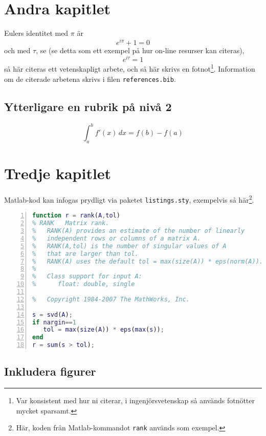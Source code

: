 \documentclass[10pt,oneside,swedish]{lips}
\begin{document}
\section{Andra kapitlet}
Eulers identitet med $\pi$ är
\begin{equation}
  e^{i\pi} + 1 = 0
\end{equation}
och med $\tau$, se \citep{HartVi:2011} (se detta som ett exempel på
hur on-line resurser kan citeras), 
\begin{equation}
  e^{i\tau} = 1
\end{equation}
så här citeras ett vetenskapligt arbete\citep{einstein1905uber}, och
så här skrivs en fotnot\footnote{Var konsistent med hur ni citerar, i
  ingenjörsvetenskap så används fotnötter mycket
  sparsamt.}. Information om de citerade arbetena skrivs i filen \texttt{references.bib}.

\subsection{Ytterligare en rubrik på nivå 2}
\lipsum[10]

\begin{equation}
  \int_{a}^{b} f'(x)\,dx = f(b)-f(a)
\end{equation}

\section{Tredje kapitlet}
Matlab-kod kan infogas prydligt via paketet \texttt{listings.sty},
exempelvis så här\footnote{Här, koden från Matlab-kommandot
  \texttt{rank} används som exempel.}.
\begin{lstlisting}[language=Matlab,frame=single, numbers=left, stepnumber=2]
function r = rank(A,tol)
% RANK   Matrix rank.
%   RANK(A) provides an estimate of the number of linearly
%   independent rows or columns of a matrix A.
%   RANK(A,tol) is the number of singular values of A
%   that are larger than tol.
%   RANK(A) uses the default tol = max(size(A)) * eps(norm(A)).
%
%   Class support for input A:
%      float: double, single

%   Copyright 1984-2007 The MathWorks, Inc.

s = svd(A);
if nargin==1
   tol = max(size(A)) * eps(max(s));
end
r = sum(s > tol);
\end{lstlisting}

\subsection{Inkludera figurer}
\lipsum[7]
\end{document}

